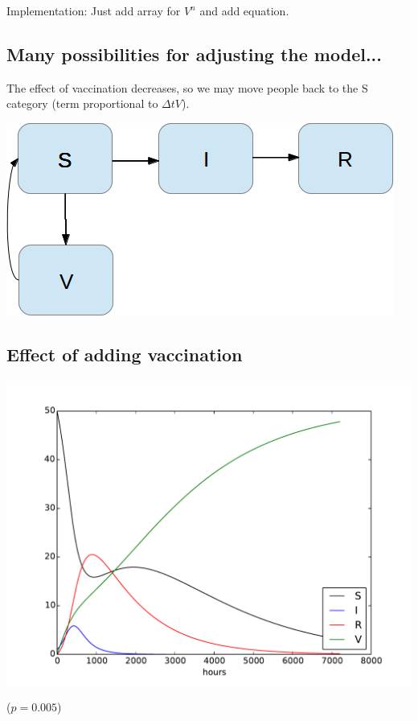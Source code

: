 \documentclass[%
twoside,                 %
final,                   %
10pt]{article}
\begin{document}
Implementation: Just add array for $V^n$ and add equation.

\subsection{Many possibilities for adjusting the model...}

The effect of vaccination decreases, so we may move people back to
the S category (term proportional to $\Delta t V$).


\begin{center}  %
  \centerline{\includegraphics[width=0.7\linewidth]{fig/categories_SIRV_feedback.png}}
\end{center}



\subsection{Effect of adding vaccination}


\begin{center}  %
  \centerline{\includegraphics[width=0.8\linewidth]{fig/SIRV1.pdf}}
\end{center}


($p=0.005$)
\end{document}

